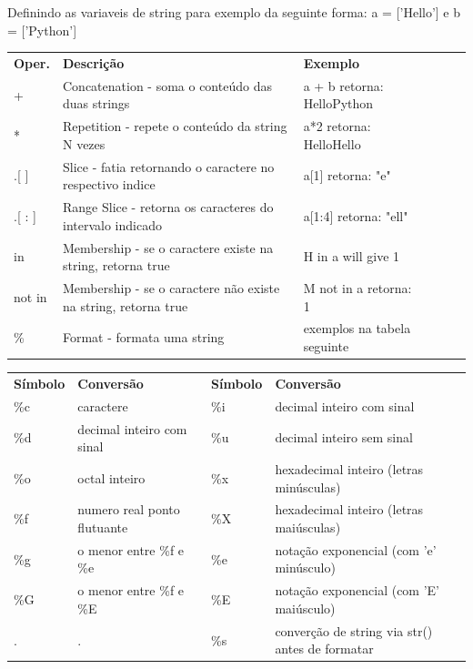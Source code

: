 \documentclass[landscape,a0paper,fontscale=0.285]{baposter} %
\begin{document}
\begin{poster}
{						%
						\colorbox[HTML]{CCFFFF}{}
						Definindo as variaveis de string para exemplo da seguinte forma: a = ['Hello'] e b = ['Python'] \\
						\begin{tabular}{lp{9.0cm}lp{1.0cm}lp{1.0cm}} %
							{\bf Oper.} & {\bf Descrição} & {\bf Exemplo} \\
							+ & Concatenation - soma o conteúdo das duas strings & a + b retorna: HelloPython \\
							* & Repetition - repete o conteúdo da string N vezes & a*2 retorna: HelloHello \\
							.[ ] & Slice - fatia retornando o caractere no respectivo indice & a[1] retorna: "e" \\
							.[ : ] & Range Slice - retorna os caracteres do intervalo indicado & a[1:4] retorna: "ell" \\
							in & Membership - se o caractere existe na string, retorna true & H in a will give 1 \\
							not in & Membership - se o caractere não existe na string, retorna true & M not in a retorna: 1 \\
							\% & Format - formata uma string & exemplos na tabela seguinte \\
						\end{tabular}
						
						\colorbox[HTML]{CCFFFF}{}
						\begin{tabular}{ll|ll} %
							{\bf Símbolo} & {\bf Conversão} & {\bf Símbolo} & {\bf Conversão} \\
							\%c & caractere					& \%i & decimal inteiro com sinal \\
							\%d & decimal inteiro com sinal	& \%u & decimal inteiro sem sinal \\
							\%o & octal inteiro				& \%x & hexadecimal inteiro (letras minúsculas) \\
							\%f & numero real ponto flutuante & \%X & hexadecimal inteiro (letras maiúsculas) \\
							\%g & o menor entre \%f e \%e & \%e & notação exponencial (com 'e' minúsculo) \\
							\%G & o menor entre \%f e \%E & \%E & notação exponencial (com 'E' maiúsculo) \\
							. & . & \%s & converção de string via str() antes de formatar \\
						\end{tabular}
						
}
\end{poster}
\end{document}
